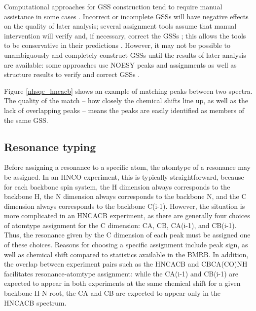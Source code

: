 Computational approaches for GSS construction tend to require manual 
assistance in some cases \cite{autoassign1997, mars}.  Incorrect or 
incomplete GSSs will have negative effects on the quality of later 
analysis; several assignment tools assume that manual intervention will 
verify and, if necessary, correct the GSSs \cite{williamson2009automated}; 
this allows the tools to be conservative in their 
predictions \cite{autoassign1997}.  However, it may not be 
possible to unambiguously and completely construct GSSs until the results 
of later analysis are available: some approaches use NOESY peaks and 
assignments as well as structure results to verify and correct GSSs 
\cite{autoassign1997}.

Figure \ref{nhsqc_hncacb} shows an example of matching peaks between two
spectra.  The quality of the match -- how closely the chemical shifts line up,
as well as the lack of overlapping peaks -- means the peaks are easily
identified as members of the same GSS.

\subsection*{Resonance typing}
Before assigning a resonance to a specific 
atom, the atomtype of a resonance may be assigned.  In an HNCO experiment, 
this is typically straightforward, because for each backbone spin system, 
the H dimension always corresponds to the backbone H, the N dimension always 
corresponds to the backbone N, and the C dimension always corresponds to the 
backbone C(i-1).  However, the situation is more complicated in an HNCACB 
experiment, as there are generally four choices of atomtype assignment for 
the C dimension:  CA, CB, CA(i-1), and CB(i-1).  Thus, the resonance given 
by the C dimension of each peak must be assigned one of these choices.  
Reasons for choosing a specific assignment include peak sign, as well as 
chemical shift compared to statistics available in the BMRB.  In addition, 
the overlap between experiment pairs such as the HNCACB and CBCA(CO)NH 
facilitates resonance-atomtype assignment: while the CA(i-1) and CB(i-1) 
are expected to appear in both experiments at the same chemical shift for 
a given backbone H-N root, the CA and CB are expected to appear only in the 
HNCACB spectrum.


